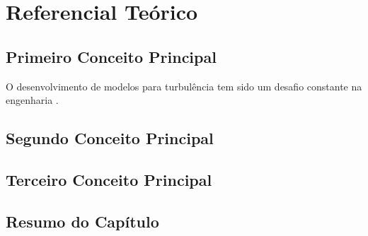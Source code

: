 \chapter{Referencial Teórico}
\label{cap-referencial-teorico}


\section{Primeiro Conceito Principal}
\label{rt-conceito1}

\begin{citacao}
O desenvolvimento de modelos para turbulência tem sido um desafio constante na engenharia \cite{bordalo1989}.
\end{citacao}

\section{Segundo Conceito Principal}
\label{rt-conceito2}

\section{Terceiro Conceito Principal}
\label{rt-conceito3}

\section{Resumo do Capítulo}
\label{rt-resumo}
